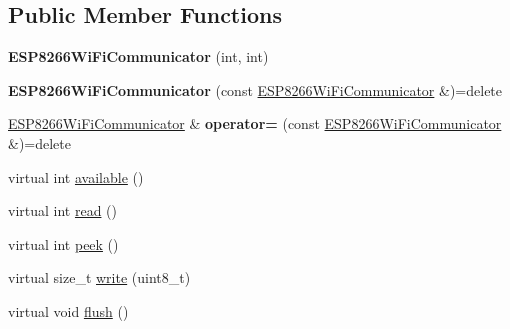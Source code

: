 \subsection*{Public Member Functions}
\begin{DoxyCompactItemize}
\item 
\mbox{\label{classathome_1_1communication_1_1wifi_1_1_e_s_p8266_wi_fi_communicator_a243e2a1e06278152e9b05b171d4fa14e}} 
{\bfseries E\+S\+P8266\+Wi\+Fi\+Communicator} (int, int)
\item 
\mbox{\label{classathome_1_1communication_1_1wifi_1_1_e_s_p8266_wi_fi_communicator_a494ac790093af57da729cef136adf0b2}} 
{\bfseries E\+S\+P8266\+Wi\+Fi\+Communicator} (const \mbox{\hyperlink{classathome_1_1communication_1_1wifi_1_1_e_s_p8266_wi_fi_communicator}{E\+S\+P8266\+Wi\+Fi\+Communicator}} \&)=delete
\item 
\mbox{\label{classathome_1_1communication_1_1wifi_1_1_e_s_p8266_wi_fi_communicator_a7c880abd129da8dc00cd82696e4034e3}} 
\mbox{\hyperlink{classathome_1_1communication_1_1wifi_1_1_e_s_p8266_wi_fi_communicator}{E\+S\+P8266\+Wi\+Fi\+Communicator}} \& {\bfseries operator=} (const \mbox{\hyperlink{classathome_1_1communication_1_1wifi_1_1_e_s_p8266_wi_fi_communicator}{E\+S\+P8266\+Wi\+Fi\+Communicator}} \&)=delete
\item 
virtual int \mbox{\hyperlink{classathome_1_1communication_1_1wifi_1_1_e_s_p8266_wi_fi_communicator_af9b1e28910959893748763faaa5373a0}{available}} ()
\item 
virtual int \mbox{\hyperlink{classathome_1_1communication_1_1wifi_1_1_e_s_p8266_wi_fi_communicator_a1cadc570e912c164279ef0ebc5b178a5}{read}} ()
\item 
virtual int \mbox{\hyperlink{classathome_1_1communication_1_1wifi_1_1_e_s_p8266_wi_fi_communicator_affeb5491ad5c97fa53a683926f8184d2}{peek}} ()
\item 
virtual size\+\_\+t \mbox{\hyperlink{classathome_1_1communication_1_1wifi_1_1_e_s_p8266_wi_fi_communicator_afd3c1c4ce7d68717a7bb2cf1b9dc962f}{write}} (uint8\+\_\+t)
\item 
virtual void \mbox{\hyperlink{classathome_1_1communication_1_1wifi_1_1_e_s_p8266_wi_fi_communicator_af95ca7f47285b13fc895e0d9323ee320}{flush}} ()

\end{DoxyCompactItemize}
